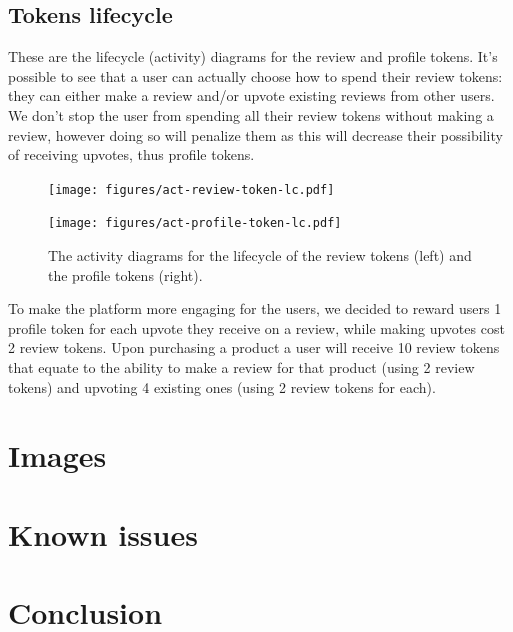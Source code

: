 \documentclass[12pt,a4paper,oneside]{article}
\theoremstyle{definition}
\begin{document}
\newpage

\subsection{Tokens lifecycle}

These are the lifecycle (activity) diagrams for the review and profile tokens.
It's possible to see that a user can actually choose how to spend their review tokens:
they can either make a review and/or upvote existing reviews from other users.
We don't stop the user from spending all their review tokens without making a review, however doing so will penalize them as this will decrease their possibility of receiving upvotes, thus profile tokens.

\begin{figure}[H]
	\centering
	\begin{minipage}{0.49\linewidth}
		\centering
		\texttt{[image: figures/act-review-token-lc.pdf]}
		\label{fig:act-review-token-lifecycle}
	\end{minipage}%
	\begin{minipage}{0.49\linewidth}
		\centering
		\texttt{[image: figures/act-profile-token-lc.pdf]}
		\label{fig:act-review-token-lifecycle}
	\end{minipage}
	\caption{The activity diagrams for the lifecycle of the review tokens (left) and the profile tokens (right).}
\end{figure}

To make the platform more engaging for the users, we decided to reward users 1 profile token for each upvote they receive on a review, while making upvotes cost 2 review tokens. Upon purchasing a product a user will receive 10 review tokens that equate to the ability to make a review for that product (using 2 review tokens) and upvoting 4 existing ones (using 2 review tokens for each).

\section{Images} %

\section{Known issues}


\section{Conclusion}

\newpage
\end{document}
